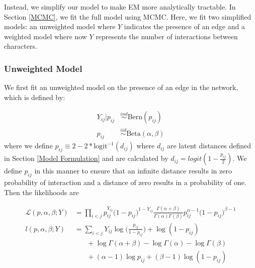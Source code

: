 \documentclass{article}
\begin{document}
Instead, we simplify our model to make EM more analytically tractable. In Section \ref{MCMC}, we fit the full model using MCMC. Here, we fit two simplified models: an unweighted model where $Y$ indicates the presence of an edge and a weighted model where now $Y$ represents the number of interactions between characters.

\subsubsection{Unweighted Model}
We first fit an unweighted model on the presence of an edge in the network, which is defined by:

\begin{align*}
Y_{ij} | p_{ij} &\overset{ind}\sim \text{Bern}(p_{ij}) \\
p_{ij} &\overset{iid}\sim \text{Beta}(\alpha, \beta)
\end{align*}
where we define $p_{ij} \equiv 2-2*\text{logit}^{-1} (d_{ij}) $ where $d_{ij}$ are latent distances defined in Section \ref{Model Formulation} and are calculated by $d_{ij} = logit(1 - \frac{p_{ij}}{2})$. We define $p_{ij}$ in this manner to ensure that an infinite distance results in zero probability of interaction and a distance of zero results in a probability of one. Then the likelihoods are 

\begin{align*}
\mathcal{L}(p, \alpha, \beta; Y) &= \prod_{i<j}p_{ij}^{Y_{ij}}\big(1 - p_{ij}\big)^{1 - Y_{ij}} \frac{\Gamma(\alpha + \beta)}{\Gamma(\alpha)\Gamma(\beta)}p_{ij}^{\alpha - 1}\big(1-p_{ij}\big)^{\beta - 1} \\
l(p, \alpha, \beta ; Y) &= \sum_{i<j} Y_{ij}\log \Big(\frac{p_{ij}}{1 - p_{ij}}\Big) + \log(1-p_{ij})  \\
&\ \ \ \ \ \ \ \ + \log \Gamma(\alpha + \beta) - \log \Gamma(\alpha) - \log \Gamma(\beta) \\
&\ \ \ \ \ \ \ \ + (\alpha - 1)\log p_{ij} + (\beta - 1)\log(1 - p_{ij})
\end{align*}

\end{document}
